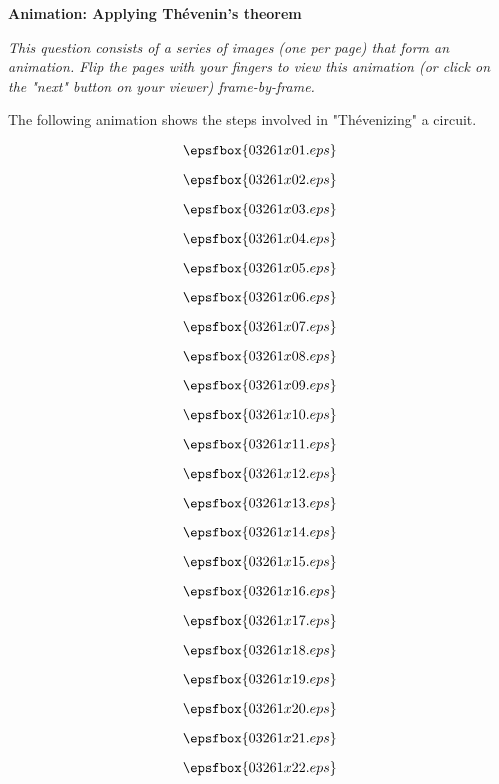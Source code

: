 

\centerline{\bf Animation: Applying Th\'evenin's theorem}

\vskip 10pt

{\it This question consists of a series of images (one per page) that form an animation.  Flip the pages with your fingers to view this animation (or click on the "next" button on your viewer) frame-by-frame.}

\vskip 10pt

The following animation shows the steps involved in "Th\'evenizing" a circuit.

\vfil \eject
$$\epsfbox{03261x01.eps}$$

\vfil \eject
$$\epsfbox{03261x02.eps}$$

\vfil \eject
$$\epsfbox{03261x03.eps}$$

\vfil \eject
$$\epsfbox{03261x04.eps}$$

\vfil \eject
$$\epsfbox{03261x05.eps}$$

\vfil \eject
$$\epsfbox{03261x06.eps}$$

\vfil \eject
$$\epsfbox{03261x07.eps}$$

\vfil \eject
$$\epsfbox{03261x08.eps}$$

\vfil \eject
$$\epsfbox{03261x09.eps}$$

\vfil \eject
$$\epsfbox{03261x10.eps}$$

\vfil \eject
$$\epsfbox{03261x11.eps}$$

\vfil \eject
$$\epsfbox{03261x12.eps}$$

\vfil \eject
$$\epsfbox{03261x13.eps}$$

\vfil \eject
$$\epsfbox{03261x14.eps}$$

\vfil \eject
$$\epsfbox{03261x15.eps}$$

\vfil \eject
$$\epsfbox{03261x16.eps}$$

\vfil \eject
$$\epsfbox{03261x17.eps}$$

\vfil \eject
$$\epsfbox{03261x18.eps}$$

\vfil \eject
$$\epsfbox{03261x19.eps}$$

\vfil \eject
$$\epsfbox{03261x20.eps}$$

\vfil \eject
$$\epsfbox{03261x21.eps}$$

\vfil \eject
$$\epsfbox{03261x22.eps}$$

